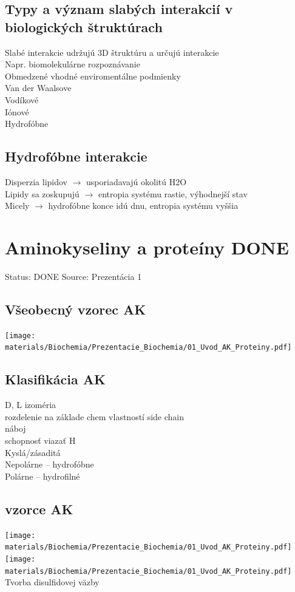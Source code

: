 \subsection{Typy a význam slabých interakcií v biologických štruktúrach}
Slabé interakcie udržujú 3D štruktúru a určujú interakcie\\
\tab Napr. biomolekulárne rozpoznávanie\\
\tab Obmedzené vhodné enviromentálne podmienky\\
Van der Waalsove\\
Vodíkové\\
Iónové\\
Hydrofóbne
\subsection{Hydrofóbne interakcie}
Disperzia lipidov $\rightarrow$ usporiadavajú okolitú H2O\\
Lipidy sa zoskupujú $\rightarrow$ entropia systému rastie, výhodnejší stav\\
Micely $\rightarrow$ hydrofóbne konce idú dnu, entropia systému vyššia\\

\section{Aminokyseliny a proteíny DONE}

Status: DONE
Source: Prezentácia 1
\\
\subsection{Všeobecný vzorec AK}
\texttt{[image: materials/Biochemia/Prezentacie\_Biochemia/01\_Uvod\_AK\_Proteiny.pdf]}
\subsection{Klasifikácia AK}
D, L izoméria\\
rozdelenie na základe chem vlastností side chain\\
\tab náboj\\
\tab schopnosť viazať H\\
\tab Kyslá/zásaditá\\
Nepolárne -- hydrofóbne\\
Polárne -- hydrofilné
\subsection{vzorce AK}
\texttt{[image: materials/Biochemia/Prezentacie\_Biochemia/01\_Uvod\_AK\_Proteiny.pdf]}
\texttt{[image: materials/Biochemia/Prezentacie\_Biochemia/01\_Uvod\_AK\_Proteiny.pdf]}
\\
Tvorba disulfidovej väzby

